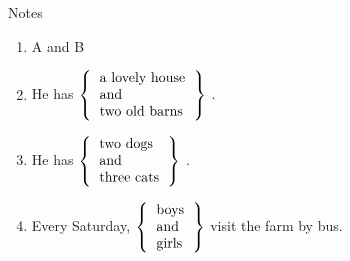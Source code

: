 \documentclass[aspectratio=169,xcolor={dvipsnames,table}]{beamer}
\begin{document}
\begin{frame}[plain]{Notes}
  \hypertarget{AandB}{}
  \begin{enumerate}[<+->]
    \setlength{\itemsep}{5pt}
    \item A and B
    \item He has $\left\{
            \begin{tabular}{l}
              a lovely house \\
              and            \\
              two old barns  \\
            \end{tabular}\right\}$ .
    \item He has $\left\{
            \begin{tabular}{l}
              two dogs   \\
              and        \\
              three cats \\
            \end{tabular}\right\}$ .
    \item Every Saturday, $\left\{
            \begin{tabular}{l}
              boys  \\
              and   \\
              girls \\
            \end{tabular}\right\}$ visit the farm by bus.
  \end{enumerate}

  \hfill\hyperlink{READING}{}

\end{frame}
\end{document}
